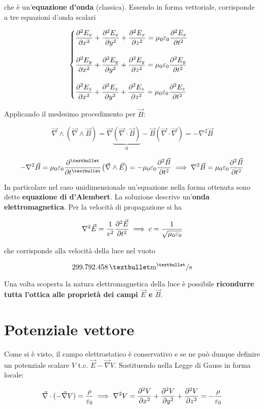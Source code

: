 che è un'\textbf{equazione d'onda} (classica). Essendo in forma vettoriale, corrisponde a tre equazioni d'onda scalari

\[\begin{cases}
\displaystyle \pdv[2]{E_x}{x} + \pdv[2]{E_x}{y} + \pdv[2]{E_x}{z} = \mu_0 \varepsilon_0 \pdv[2]{E_x}{t}\\ \\
\displaystyle \pdv[2]{E_y}{x} + \pdv[2]{E_y}{y} + \pdv[2]{E_y}{z} = \mu_0 \varepsilon_0 \pdv[2]{E_y}{t}\\ \\
\displaystyle \pdv[2]{E_z}{x} + \pdv[2]{E_z}{y} + \pdv[2]{E_z}{z} = \mu_0 \varepsilon_0 \pdv[2]{E_z}{t}
\end{cases}\]

Applicando il medesimo procedimento per $\vec{B}$:

\[\vec{\nabla} \wedge (\vec{\nabla} \wedge \vec{B}) = \vec{\nabla} \underbrace{(\vec{\nabla} \cdot \vec{B})}_{0} - \vec{B} (\vec{\nabla} \cdot \vec{\nabla}) = - \nabla^2 \vec{B}\]

\[- \nabla^2 \vec{B} = \mu_0 \varepsilon_0 \pdv[•]{}{t} \big(\vec{\nabla} \wedge \vec{E}\big) = - \mu_0 \varepsilon_0 \pdv[2]{\vec{B}}{t} \implies \nabla^2 \vec{B} = \mu_0 \varepsilon_0 \pdv[2]{\vec{B}}{t}\]

In particolare nel caso unidimensionale un'equazione nella forma ottenuta sono dette \textbf{equazione di d'Alembert}. La soluzione descrive un'\textbf{onda elettromagnetica}. Per la velocità di propagazione si ha

\[\nabla^2 \vec{E} = \frac{1}{v^2} \pdv[2]{\vec{E}}{t} \implies c = \frac{1}{\displaystyle \sqrt{\mu_0 \varepsilon_0}}\]

che corrisponde alla velocità della luce nel vuoto

\[299.792.458 \meters{•}{•}/\mathrm{s}\]

Una volta scoperta la natura elettromagnetica della luce è possibile \textbf{ricondurre tutta l'ottica alle proprietà dei campi $\vec{E}$ e $\vec{B}$}.

\section{Potenziale vettore}
Come si è visto, il campo elettrostatico è conservativo e se ne può dunque definire un potenziale scalare $V$ t.c. $\vec{E} - \vec{\nabla} V$. Sostituendo nella Legge di Gauss in forma locale:

\[\vec{\nabla} \cdot (- \vec{\nabla} V) = \frac{\rho}{\varepsilon_0} \implies \nabla^2 V = \pdv[2]{V}{x} + \pdv[2]{V}{y} + \pdv[2]{V}{z} = - \frac{\rho}{\varepsilon_0}\]

